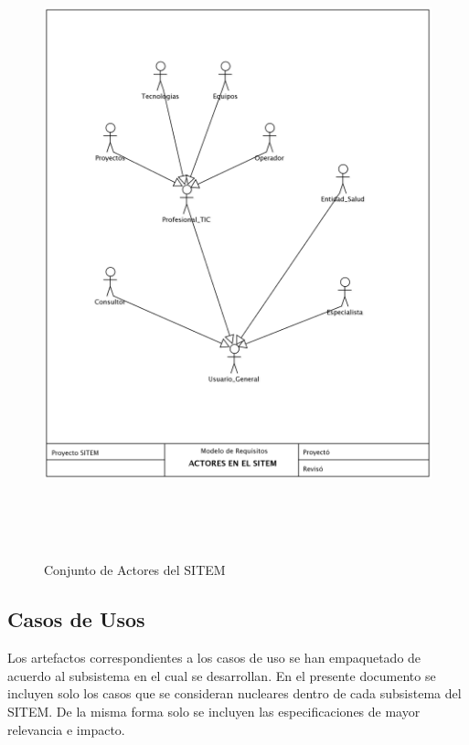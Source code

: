 \begin{figure}
 \centering
 \includegraphics[width=156mm, height=182mm]{actores.png}
 \caption{Conjunto de Actores del SITEM}
 \label{actores}
\end{figure}

\subsection{Casos de Usos}
Los artefactos correspondientes a los casos de uso se han empaquetado de acuerdo al subsistema en el cual se desarrollan. En el presente documento se incluyen solo los casos que se consideran nucleares dentro de cada subsistema del SITEM. De la misma forma solo se incluyen las especificaciones de mayor relevancia e impacto.

